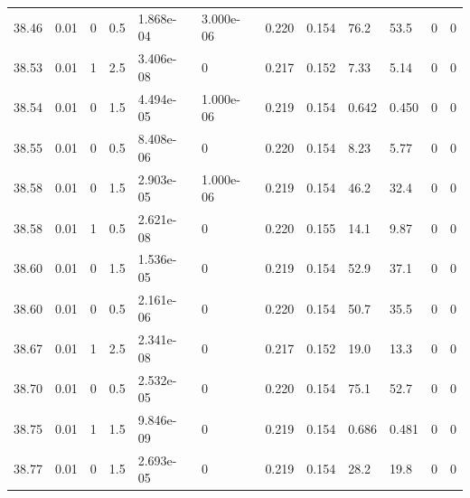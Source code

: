 \documentclass[preview]{standalone}
\begin{document}
{{{{{{{{{{{{{{{{{{\begin{tabular}{L{1.2cm}C{1.2cm} C{0.3cm}C{0.5cm} C{1.4cm}C{1.4cm} C{1.4cm}C{1.4cm} C{1.6cm}C{1.6cm} C{1.6cm}C{1.6cm}}
  38.46  &  0.01  & 0     & 0.5 &  1.868e-04  & 3.000e-06  &  0.220&   0.154& 76.2 & 53.5   &  0 & 0  \\ 
  38.53  &  0.01  & 1     & 2.5 &  3.406e-08  & 0  &  0.217&   0.152& 7.33 & 5.14   &  0 & 0  \\ 
  38.54  &  0.01  & 0     & 1.5 &  4.494e-05  & 1.000e-06  &  0.219&   0.154& 0.642 & 0.450   &  0 & 0  \\ 
  38.55  &  0.01  & 0     & 0.5 &  8.408e-06  & 0  &  0.220&   0.154& 8.23 & 5.77   &  0 & 0  \\ 
  38.58  &  0.01  & 0     & 1.5 &  2.903e-05  & 1.000e-06  &  0.219&   0.154& 46.2 & 32.4   &  0 & 0  \\ 
  38.58  &  0.01  & 1     & 0.5 &  2.621e-08  & 0  &  0.220&   0.155& 14.1 & 9.87   &  0 & 0  \\ 
  38.60  &  0.01  & 0     & 1.5 &  1.536e-05  & 0  &  0.219&   0.154& 52.9 & 37.1   &  0 & 0  \\ 
  38.60  &  0.01  & 0     & 0.5 &  2.161e-06  & 0  &  0.220&   0.154& 50.7 & 35.5   &  0 & 0  \\ 
  38.67  &  0.01  & 1     & 2.5 &  2.341e-08  & 0  &  0.217&   0.152& 19.0 & 13.3   &  0 & 0  \\ 
  38.70  &  0.01  & 0     & 0.5 &  2.532e-05  & 0  &  0.220&   0.154& 75.1 & 52.7   &  0 & 0  \\ 
  38.75  &  0.01  & 1     & 1.5 &  9.846e-09  & 0  &  0.219&   0.154& 0.686 & 0.481   &  0 & 0  \\ 
  38.77  &  0.01  & 0     & 1.5 &  2.693e-05  & 0  &  0.219&   0.154& 28.2 & 19.8   &  0 & 0  \\ 
\hline 
\end{tabular} 

}}}}}}}}}}}}}}}}}}
\end{document}
